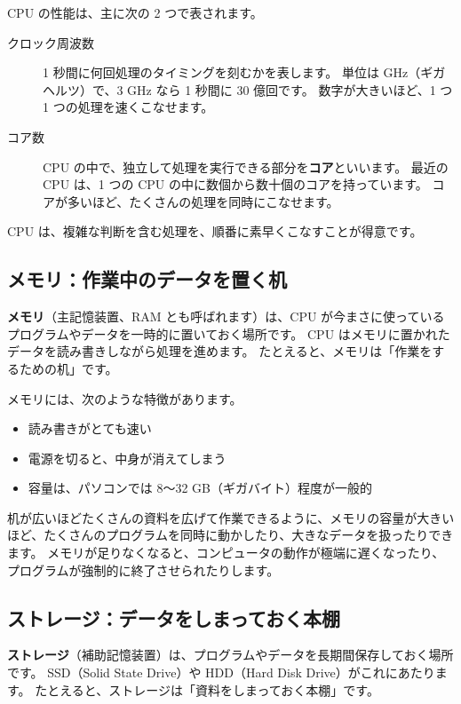 CPU の性能は、主に次の 2 つで表されます。

\begin{description}
  \item[クロック周波数]
    1 秒間に何回処理のタイミングを刻むかを表します。
    単位は GHz（ギガヘルツ）で、3 GHz なら 1 秒間に 30 億回です。
    数字が大きいほど、1 つ 1 つの処理を速くこなせます。
  \item[コア数]
    CPU の中で、独立して処理を実行できる部分を\textbf{コア}といいます。
    最近の CPU は、1 つの CPU の中に数個から数十個のコアを持っています。
    コアが多いほど、たくさんの処理を同時にこなせます。
\end{description}

CPU は、複雑な判断を含む処理を、順番に素早くこなすことが得意です。

\subsection{メモリ：作業中のデータを置く机}

\textbf{メモリ}（主記憶装置、RAM とも呼ばれます）は、CPU が今まさに使っているプログラムやデータを一時的に置いておく場所です。
CPU はメモリに置かれたデータを読み書きしながら処理を進めます。
たとえると、メモリは「作業をするための机」です。

メモリには、次のような特徴があります。

\begin{itemize}
  \item 読み書きがとても速い
  \item 電源を切ると、中身が消えてしまう
  \item 容量は、パソコンでは 8〜32 GB（ギガバイト）程度が一般的
\end{itemize}

机が広いほどたくさんの資料を広げて作業できるように、メモリの容量が大きいほど、たくさんのプログラムを同時に動かしたり、大きなデータを扱ったりできます。
メモリが足りなくなると、コンピュータの動作が極端に遅くなったり、プログラムが強制的に終了させられたりします。

\subsection{ストレージ：データをしまっておく本棚}

\textbf{ストレージ}（補助記憶装置）は、プログラムやデータを長期間保存しておく場所です。
SSD（Solid State Drive）や HDD（Hard Disk Drive）がこれにあたります。
たとえると、ストレージは「資料をしまっておく本棚」です。

